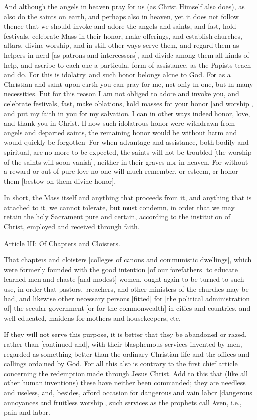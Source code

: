 And although the angels in heaven pray for us (as Christ
Himself also does), as also do the saints on earth, and
perhaps also in heaven, yet it does not follow thence that we
should invoke and adore the angels and saints, and fast, hold
festivals, celebrate Mass in their honor, make offerings, and
establish churches, altars, divine worship, and in still other
ways serve them, and regard them as helpers in need [as
patrons and intercessors], and divide among them all kinds of
help, and ascribe to each one a particular form of assistance,
as the Papists teach and do. For this is idolatry, and such
honor belongs alone to God. For as a Christian and saint upon
earth you can pray for me, not only in one, but in many
necessities. But for this reason I am not obliged to adore and
invoke you, and celebrate festivals, fast, make oblations,
hold masses for your honor [and worship], and put my faith in
you for my salvation. I can in other ways indeed honor, love,
and thank you in Christ. If now such idolatrous honor were
withdrawn from angels and departed saints, the remaining honor
would be without harm and would quickly be forgotten. For when
advantage and assistance, both bodily and spiritual, are no
more to be expected, the saints will not be troubled [the
worship of the saints will soon vanish], neither in their
graves nor in heaven. For without a reward or out of pure love
no one will much remember, or esteem, or honor them [bestow on
them divine honor].

In short, the Mass itself and anything that proceeds from it,
and anything that is attached to it, we cannot tolerate, but
must condemn, in order that we may retain the holy Sacrament
pure and certain, according to the institution of Christ,
employed and received through faith.




Article III: Of Chapters and Cloisters.

That chapters and cloisters [colleges of canons and
communistic dwellings], which were formerly founded with the
good intention [of our forefathers] to educate learned men and
chaste [and modest] women, ought again to be turned to such
use, in order that pastors, preachers, and other ministers of
the churches may be had, and likewise other necessary persons
[fitted] for [the political administration of] the secular
government [or for the commonwealth] in cities and countries,
and well-educated, maidens for mothers and housekeepers, etc.

If they will not serve this purpose, it is better that they be
abandoned or razed, rather than [continued and], with their
blasphemous services invented by men, regarded as something
better than the ordinary Christian life and the offices and
callings ordained by God. For all this also is contrary to the
first chief article concerning the redemption made through
Jesus Christ. Add to this that (like all other human
inventions) these have neither been commanded; they are
needless and useless, and, besides, afford occasion for
dangerous and vain labor [dangerous annoyances and fruitless
worship], such services as the prophets call Aven, i.e., pain
and labor.




